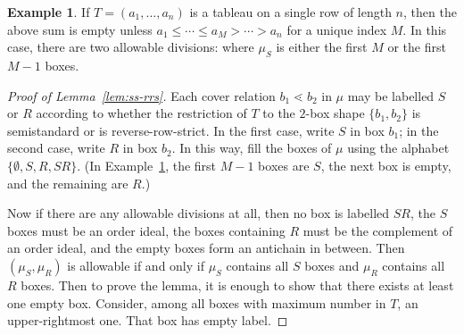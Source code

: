 \documentclass[11pt]{article}
\theoremstyle{definition}
\newtheorem{exam}[theorem]{Example}
\begin{document}
\begin{exam}\label{ex:strip}
If $T = (a_1,\ldots,a_n)$ is a tableau on a single row of length $n$, then the above sum is empty unless $a_1 \le \cdots \le a_M > \cdots > a_n$ for a unique index $M$. In this case, there are two allowable divisions: where $\mu_S$ is either the first $M$ or the first $M-1$ boxes.
\end{exam}

\begin{proof}[Proof of Lemma~\ref{lem:ss-rrs}]
Each cover relation $b_1 \lessdot b_2$ in $\mu$ may be labelled $S$ or $R$ according to whether the restriction of $T$ to the $2$-box shape $\{b_1,b_2\}$ is semistandard or is reverse-row-strict. In the first case, write $S$ in box $b_1$; in the second case, write $R$ in box $b_2$. In this way, fill the boxes of $\mu$ using the alphabet $\{\emptyset, S, R, SR\}$. (In Example~\ref{ex:strip}, the first $M-1$ boxes are $S$, the next box is empty, and the remaining are $R$.) 

Now if there are any allowable divisions at all, then no box is labelled $SR$, the $S$ boxes must be an order ideal, the boxes containing $R$ must be the complement of an order ideal, and the empty boxes form an antichain in between. Then $(\mu_S,\mu_R)$ is allowable if and only if $\mu_S$ contains all $S$ boxes and $\mu_R$ contains all $R$ boxes. Then to prove the lemma, it is enough to show that there exists at least one empty box. Consider, among all boxes with maximum number in $T$, an upper-rightmost one. That box has empty label.
\end{proof}
\end{document}
